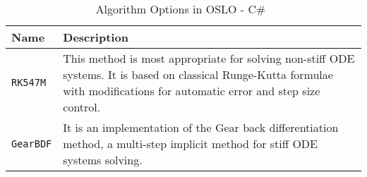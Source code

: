 \begin{table}[ht]
\begin{tabular}{ p{} p{} }
	\textbf{Name} & \textbf{Description} \\
	\toprule
	\verb|RK547M| & This method is most appropriate for solving non-stiff ODE systems. It is based on classical Runge-Kutta formulae with modifications for automatic error and step size control.\\ \hline
	\verb|GearBDF| & It is an implementation of the Gear back differentiation method, a multi-step implicit method for stiff ODE systems solving.\\
	\bottomrule	
\end{tabular}	
\caption{Algorithm Options in OSLO - C\#~\citep{oslofun}}	
\label{tab_algodeint}
\end{table}

